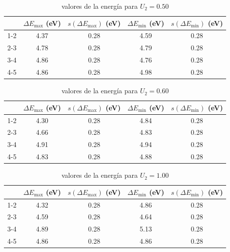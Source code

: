 \documentclass[12pt,a4paper]{article}
\numberwithin{equation}{section}
\numberwithin{figure}{section}
\begin{document}
 
 
\begin{table}[h!] \centering 
\begin{tabular}{ccccc} 
\hline  & $ \Delta E_{\max} $ (eV) & $s(\Delta E_{\max})$ (eV) & $ \Delta E_{\min} $ (eV) & $s(\Delta E_{\min})$ (eV) \\ \hline 
1-2 & 4.37 & 0.28 & 4.59 & 0.28 \\ 
2-3 & 4.78 & 0.28 & 4.79 & 0.28 \\ 
3-4 & 4.86 & 0.28 & 4.76 & 0.28 \\ 
4-5 & 4.86 & 0.28 & 4.98 & 0.28 \\ 
\hline 
\end{tabular}\caption{valores de la energía para $U_2=0.50$} 
\label{Tab:E-lab-2} 
\end{table} 

 
 
\begin{table}[h!] \centering 
\begin{tabular}{ccccc} 
\hline  & $ \Delta E_{\max} $ (eV) & $s(\Delta E_{\max})$ (eV) & $ \Delta E_{\min} $ (eV) & $s(\Delta E_{\min})$ (eV) \\ \hline 
1-2 & 4.30 & 0.28 & 4.84 & 0.28 \\ 
2-3 & 4.66 & 0.28 & 4.83 & 0.28 \\ 
3-4 & 4.91 & 0.28 & 4.94 & 0.28 \\ 
4-5 & 4.83 & 0.28 & 4.88 & 0.28 \\ 
\hline 
\end{tabular}\caption{valores de la energía para $U_2=0.60$} 
\label{Tab:E-lab-3} 
\end{table} 

 
 
\begin{table}[h!] \centering 
\begin{tabular}{ccccc} 
\hline  & $ \Delta E_{\max} $ (eV) & $s(\Delta E_{\max})$ (eV) & $ \Delta E_{\min} $ (eV) & $s(\Delta E_{\min})$ (eV) \\ \hline 
1-2 & 4.32 & 0.28 & 4.86 & 0.28 \\ 
2-3 & 4.59 & 0.28 & 4.64 & 0.28 \\ 
3-4 & 4.89 & 0.28 & 5.13 & 0.28 \\ 
4-5 & 4.86 & 0.28 & 4.86 & 0.28 \\ 
\hline 
\end{tabular}\caption{valores de la energía para $U_2=1.00$} 
\label{Tab:E-lab-4} 
\end{table} 
\end{document}
